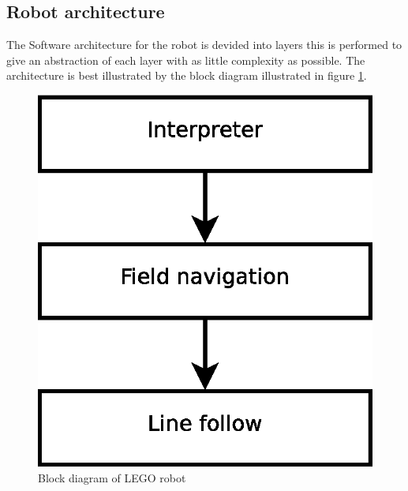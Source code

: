 \documentclass[draft, english, a4paper, 10pt]{article}
\begin{document}
	\subsection{Robot architecture}
	    The Software architecture for the robot is devided into layers
	    this is performed to give an abstraction
	    of each layer with as little complexity as possible. The architecture
	    is best illustrated by the block diagram illustrated in figure \ref{fig:robotBlockDiagram}.
	    \begin{figure}[htp]
            \centering
    	    \includegraphics[scale=0.45]{robotBlockdiagram}
	        \caption{Block diagram of LEGO robot}\label{fig:robotBlockDiagram}
        \end{figure}
\end{document}
